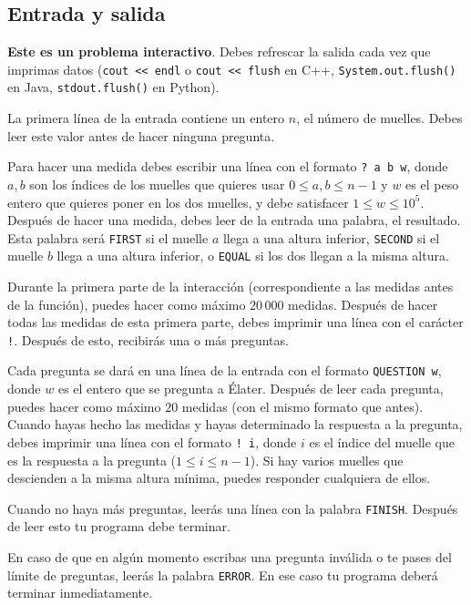 \documentclass[10.5pt]{article}
\begin{document}
\subsection*{Entrada y salida}

\textbf{Este es un problema interactivo}. Debes refrescar la salida cada vez que imprimas datos (\texttt{cout << endl} o \texttt{cout << flush} en C++, \texttt{System.out.flush()} en Java, \texttt{stdout.flush()} en Python).

La primera l\'inea de la entrada contiene un entero $n$, el n\'umero de muelles. Debes leer este valor antes de hacer ninguna pregunta.

Para hacer una medida debes escribir una l\'inea con el formato \verb#? a b w#, donde $a, b$ son los \'indices de los muelles que quieres usar $0 \leq a, b \leq n-1$ y $w$ es el peso entero que quieres poner en los dos muelles, y debe satisfacer $1 \leq w \leq 10^5$. Despu\'es de hacer una medida, debes leer de la entrada una palabra, el resultado. Esta palabra ser\'a \verb#FIRST# si el muelle $a$ llega a una altura inferior, \texttt{SECOND} si el muelle $b$ llega a una altura inferior, o \texttt{EQUAL} si los dos llegan a la misma altura.

Durante la primera parte de la interacci\'on (correspondiente a las medidas antes de la funci\'on), puedes hacer como m\'aximo $20\,000$ medidas. Despu\'es de hacer todas las medidas de esta primera parte, debes imprimir una l\'inea con el car\'acter \texttt{!}. Despu\'es de esto, recibir\'as una o m\'as preguntas.

Cada pregunta se dar\'a en una l\'inea de la entrada con el formato \texttt{QUESTION w}, donde $w$ es el entero que se pregunta a \'Elater. Despu\'es de leer cada pregunta, puedes hacer como m\'aximo $20$ medidas (con el mismo formato que antes). Cuando hayas hecho las medidas y hayas determinado la respuesta a la pregunta, debes imprimir una l\'inea con el formato \verb#! i#, donde $i$ es el \'indice del muelle que es la respuesta a la pregunta ($1 \leq i \leq n-1$). Si hay varios muelles que descienden a la misma altura m\'inima, puedes responder cualquiera de ellos.

Cuando no haya m\'as preguntas, leer\'as una l\'inea con la palabra \texttt{FINISH}. Despu\'es de leer esto tu programa debe terminar. 

En caso de que en alg\'un momento escribas una pregunta inv\'alida o te pases del l\'imite de preguntas, leer\'as la palabra \texttt{ERROR}. En ese caso tu programa deber\'a terminar inmediatamente.
\end{document}
